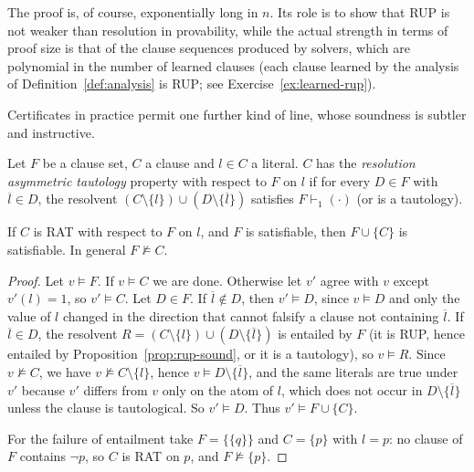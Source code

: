 The proof is, of course, exponentially long in $n$. Its role is to show that RUP is not weaker than resolution in provability, while the actual strength in terms of proof size is that of the clause sequences produced by solvers, which are polynomial in the number of learned clauses (each clause learned by the analysis of Definition~\ref{def:analysis} is RUP; see Exercise~\ref{ex:learned-rup}).

Certificates in practice permit one further kind of line, whose soundness is subtler and instructive.

\begin{definition}[RAT]
\label{def:rat}
Let $F$ be a clause set, $C$ a clause and $l\in C$ a literal. $C$ has the \emph{resolution asymmetric tautology} property with respect to $F$ on $l$ if for every $D\in F$ with $\overline{l}\in D$, the resolvent $(C\setminus\{l\})\cup(D\setminus\{\overline{l}\})$ satisfies $F\vdash_1(\cdot)$ (or is a tautology).
\end{definition}

\begin{proposition}
\label{prop:rat}
If $C$ is RAT with respect to $F$ on $l$, and $F$ is satisfiable, then $F\cup\{C\}$ is satisfiable. In general $F\not\models C$.
\end{proposition}

\begin{proof}
Let $v\models F$. If $v\models C$ we are done. Otherwise let $v'$ agree with $v$ except $v'(l)=1$, so $v'\models C$. Let $D\in F$. If $\overline{l}\notin D$, then $v'\models D$, since $v\models D$ and only the value of $l$ changed in the direction that cannot falsify a clause not containing $\overline{l}$. If $\overline{l}\in D$, the resolvent $R=(C\setminus\{l\})\cup(D\setminus\{\overline{l}\})$ is entailed by $F$ (it is RUP, hence entailed by Proposition~\ref{prop:rup-sound}, or it is a tautology), so $v\models R$. Since $v\not\models C$, we have $v\not\models C\setminus\{l\}$, hence $v\models D\setminus\{\overline{l}\}$, and the same literals are true under $v'$ because $v'$ differs from $v$ only on the atom of $l$, which does not occur in $D\setminus\{\overline{l}\}$ unless the clause is tautological. So $v'\models D$. Thus $v'\models F\cup\{C\}$.

For the failure of entailment take $F=\{\{q\}\}$ and $C=\{p\}$ with $l=p$: no clause of $F$ contains $\neg p$, so $C$ is RAT on $p$, and $F\not\models\{p\}$.
\end{proof}

